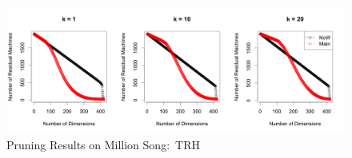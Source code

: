 \begin{figure}[htpb!]
  \centering
  \includegraphics[width=1.0\linewidth]{exp/prune/trh.png}
  \caption{Pruning Results on Million Song:~TRH}
  \label{fig:prune_trh}
\end{figure}





%
%